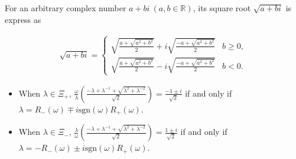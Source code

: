 \documentclass[10pt,a4paper]{amsart}
\begin{document}
\begin{lemma}\label{lemma46}
For an arbitrary complex number $a+bi \ (a,b\in \mathbb{R})$, its square root $\sqrt{a+bi}$ is express as 

\begin{eqnarray}
\sqrt{a+bi} = \left\{
\begin{array}{ll}
\sqrt{\frac{a+\sqrt{a^2+b^2}}{2}}+i\sqrt{\frac{-a+\sqrt{a^2+b^2}}{2}} &  b\geq0,\\
\sqrt{\frac{a+\sqrt{a^2+b^2}}{2}}-i\sqrt{\frac{-a+\sqrt{a^2+b^2}}{2}} & b<0.
\end{array}
\right. \nonumber 
\end{eqnarray}
\end{lemma}

\begin{lemma}\label{lemma47}
\begin{itemize}
\item[(i)]When $\lambda \in \Xi_{+}$, $\frac{\omega}{\lambda} \left( \frac{-\lambda + \lambda^{-1} + \sqrt{\lambda^2 + \lambda^{-2}}}{\sqrt{2}} \right) = \frac{-1 \pm i}{\sqrt{2}}$ if and only if $\lambda = R_{-}(\omega) \mp i\mathrm{sgn}(\omega) R_{+}(\omega)$.
\item[(ii)]When $\lambda \in \Xi _{-}$, $\frac{\lambda}{\omega}(\frac{-\lambda +\lambda^{-1}+\sqrt{\lambda^2 +\lambda^{-2}}}{\sqrt{2}})=\frac{1\pm i}{\sqrt{2}}$ if and only if $\lambda = -R_{-}(\omega) \pm i \mathrm{sgn}(\omega) R_{+}(\omega)$.
\end{itemize}
\end{lemma}
\end{document}
